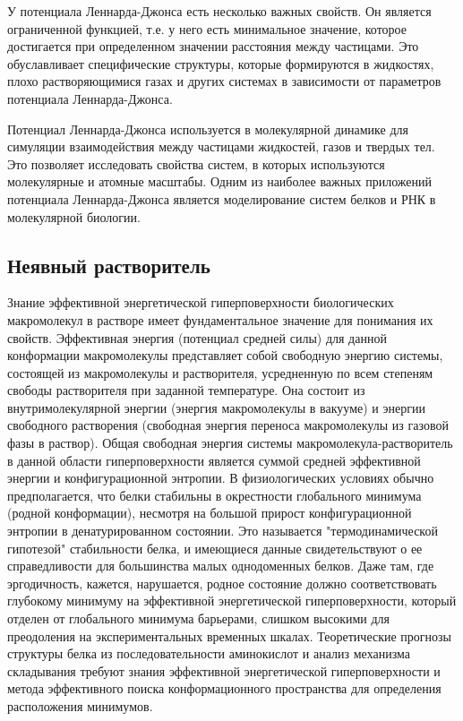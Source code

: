 У потенциала Леннарда-Джонса есть несколько важных свойств. Он является ограниченной функцией, т.е. у него есть минимальное значение, которое достигается при определенном значении расстояния между частицами. Это обуславливает специфические структуры, которые формируются в жидкостях, плохо растворяющимися газах и других системах в зависимости от параметров потенциала Леннарда-Джонса.

Потенциал Леннарда-Джонса используется в молекулярной динамике для симуляции взаимодействия между частицами жидкостей, газов и твердых тел. Это позволяет исследовать свойства систем, в которых используются молекулярные и атомные масштабы. Одним из наиболее важных приложений потенциала Леннарда-Джонса является моделирование систем белков и РНК в молекулярной биологии.


\subsection{Неявный растворитель}


Знание эффективной энергетической гиперповерхности биологических макромолекул в растворе имеет фундаментальное значение для понимания их свойств. Эффективная энергия (потенциал средней силы) для данной конформации макромолекулы представляет собой свободную энергию системы, состоящей из макромолекулы и растворителя, усредненную по всем степеням свободы растворителя при заданной температуре. Она состоит из внутримолекулярной энергии (энергия макромолекулы в вакууме) и энергии свободного растворения (свободная энергия переноса макромолекулы из газовой фазы в раствор). Общая свободная энергия системы макромолекула-растворитель в данной области гиперповерхности является суммой средней эффективной энергии и конфигурационной энтропии. В физиологических условиях обычно предполагается, что белки стабильны в окрестности глобального минимума (родной конформации), несмотря на большой прирост конфигурационной энтропии в денатурированном состоянии. Это называется "термодинамической гипотезой" стабильности белка, и имеющиеся данные свидетельствуют о ее справедливости для большинства малых однодоменных белков. Даже там, где эргодичность, кажется, нарушается, родное состояние должно соответствовать глубокому минимуму на эффективной энергетической гиперповерхности, который отделен от глобального минимума барьерами, слишком высокими для преодоления на экспериментальных временных шкалах. Теоретические прогнозы структуры белка из последовательности аминокислот и анализ механизма складывания требуют знания эффективной энергетической гиперповерхности и метода эффективного поиска конформационного пространства для определения расположения минимумов.

